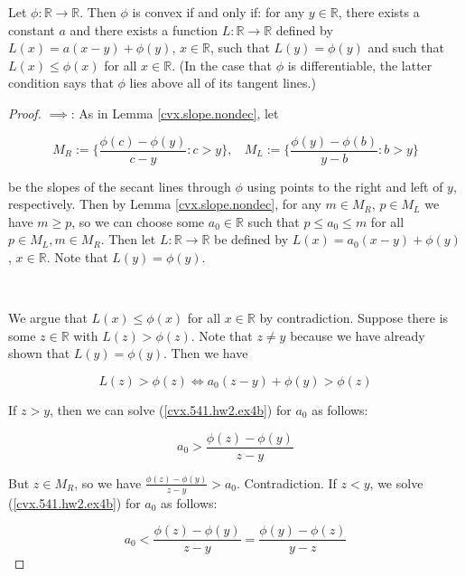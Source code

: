 \begin{theorem}\label{cvx.convex.tangent.line}
Let $\phi:\mathbb{R}\to\mathbb{R}$. Then $\phi$ is convex if and only if: for any $y\in\mathbb{R}$, there exists a constant $a$ and there exists a function $L:\mathbb{R}\to\mathbb{R}$ defined by $L(x)=a(x-y)+\phi(y)$, $x\in\mathbb{R}$, such that $L(y)=\phi(y)$ and such that $L(x)\leq\phi(x)$ for all $x\in\mathbb{R}$.  (In the case that $\phi$ is differentiable, the latter condition says that $\phi$ lies above all of its tangent lines.)
\end{theorem}

\begin{proof} \(\implies\): As in Lemma \ref{cvx.slope.nondec}, let 

\[
M_R:= \{ \frac{\phi(c) - \phi(y) }{c-y}  : c > y\}, \ \ \ \ M_L:= \{ \frac{\phi(y) - \phi(b) }{y - b}  : b > y\}
\]

be the slopes of the secant lines through \(\phi\) using points to the right and left of \(y\), respectively. Then by Lemma \ref{cvx.slope.nondec}, for any \(m \in M_R\), \(p \in M_L\) we have \(m \geq p\), so we can choose some \(a_0 \in \mathbb{R}\) such that \(p \leq a_0 \leq m\) for all \(p \in M_L, m \in M_R\). Then let $L:\mathbb{R}\to\mathbb{R}$ be defined by $L(x)=a_0(x-y)+\phi(y)$, $x\in\mathbb{R}$. Note that $L(y)=\phi(y)$. 

\

We argue that $L(x)\leq\phi(x)$ for all $x\in\mathbb{R}$ by contradiction. Suppose there is some \(z \in \mathbb{R}\) with \(L(z) > \phi(z)\). Note that \( z \neq y\) because we have already shown that \(L(y) = \phi(y)\). Then we have


\begin{equation}\label{cvx.541.hw2.ex4b}
L(z) > \phi(z) \iff a_0(z-y)+\phi(y) > \phi(z) 
\end{equation}

If \(z > y\), then we can solve (\ref{cvx.541.hw2.ex4b}) for \(a_0\) as follows:

\[
a_0 >  \frac{\phi(z) - \phi(y)}{z-y}
\]

But \(z \in M_R\), so we have \( \frac{\phi(z) - \phi(y) }{z-y} > a_0 \). Contradiction. If \(z < y\), we solve (\ref{cvx.541.hw2.ex4b}) for \(a_0\) as follows:

\[
a_0 <  \frac{\phi(z) - \phi(y)}{z-y} = \frac{\phi(y) - \phi(z) }{y-z} 
\]


\end{proof}
